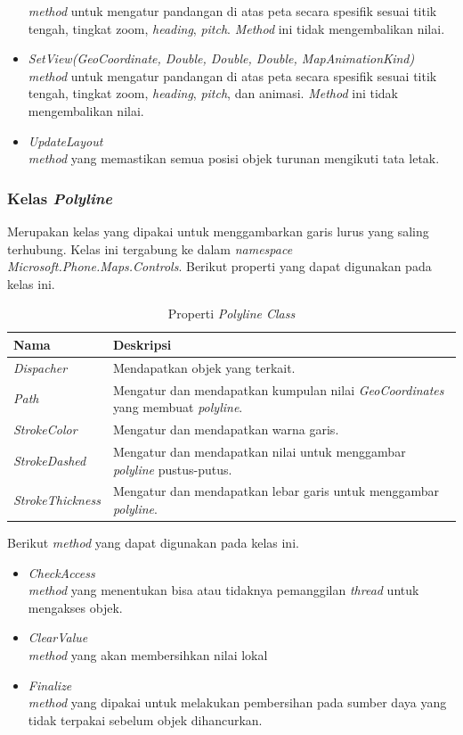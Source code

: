 \begin{itemize}
	\textit{method} untuk mengatur pandangan di atas peta secara spesifik sesuai titik tengah, tingkat zoom, \textit{heading}, \textit{pitch}. \textit{Method} ini tidak mengembalikan nilai.
	\item \textit{SetView(GeoCoordinate, Double, Double, Double, MapAnimationKind)} \\
	\textit{method} untuk mengatur pandangan di atas peta secara spesifik sesuai titik tengah, tingkat zoom, \textit{heading}, \textit{pitch}, dan animasi. \textit{Method} ini tidak mengembalikan nilai.
	\item \textit{UpdateLayout} \\
	\textit{method} yang memastikan semua posisi objek turunan mengikuti tata letak. 
\end{itemize}

\subsubsection{Kelas \textit{Polyline}}
\label{subsubsec:Polyline Class}
\hspace{0.5cm} Merupakan kelas yang dipakai untuk menggambarkan garis lurus yang saling terhubung. Kelas ini tergabung ke dalam \textit{namespace Microsoft.Phone.Maps.Controls}. 
\newpage
Berikut properti yang dapat digunakan pada kelas ini.
\begin{table}[h]
	\centering
		\begin{tabular}{ |p{4cm}|p{10cm}|}
				\hline
					Nama & Deskripsi \\ \hline
					\textit{Dispacher} & Mendapatkan objek yang terkait. \\ \hline
					\textit{Path} & Mengatur dan mendapatkan kumpulan nilai \textit{GeoCoordinates} yang membuat \textit{polyline}. \\ \hline
					\textit{StrokeColor} & Mengatur dan mendapatkan warna garis. \\ \hline
					\textit{StrokeDashed} & Mengatur dan mendapatkan nilai untuk menggambar \textit{polyline} pustus-putus. \\ \hline
					\textit{StrokeThickness} & Mengatur dan mendapatkan lebar garis untuk menggambar \textit{polyline}. \\ \hline
				\hline
		\end{tabular}
	\caption{Properti \textit{Polyline Class}}
	\label{tab:PropertiKelasPolyline}
\end{table}

Berikut \textit{method} yang dapat digunakan pada kelas ini.
\begin{itemize}
	\item \textit{CheckAccess}\\
	\textit{method} yang menentukan bisa atau tidaknya pemanggilan \textit{thread} untuk mengakses objek.
	\item \textit{ClearValue}\\
	\textit{method} yang akan membersihkan nilai lokal
	\item \textit{Finalize} \\
	\textit{method} yang dipakai untuk melakukan pembersihan pada sumber daya yang tidak terpakai sebelum objek dihancurkan.
\end{itemize}

